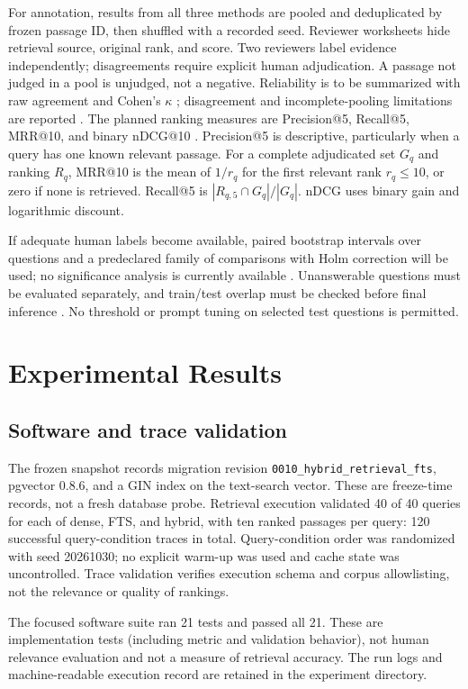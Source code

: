 \documentclass[conference]{IEEEtran}
\begin{document}
For annotation, results from all three methods are pooled and deduplicated by frozen passage ID, then shuffled with a recorded seed. Reviewer worksheets hide retrieval source, original rank, and score. Two reviewers label evidence independently; disagreements require explicit human adjudication. A passage not judged in a pool is unjudged, not a negative. Reliability is to be summarized with raw agreement and Cohen's $\kappa$ \cite{r11,r69,r70}; disagreement and incomplete-pooling limitations are reported \cite{r65,r66}. The planned ranking measures are Precision@5, Recall@5, MRR@10, and binary nDCG@10 \cite{r63,r64}. Precision@5 is descriptive, particularly when a query has one known relevant passage. For a complete adjudicated set $G_q$ and ranking $R_q$, MRR@10 is the mean of $1/r_q$ for the first relevant rank $r_q\leq10$, or zero if none is retrieved. Recall@5 is $|R_{q,5}\cap G_q|/|G_q|$. nDCG uses binary gain and logarithmic discount.

If adequate human labels become available, paired bootstrap intervals over questions and a predeclared family of comparisons with Holm correction will be used; no significance analysis is currently available \cite{r12,r67,r68}. Unanswerable questions must be evaluated separately, and train/test overlap must be checked before final inference \cite{r60,r61,r62}. No threshold or prompt tuning on selected test questions is permitted.

\section{Experimental Results}
\subsection{Software and trace validation}
The frozen snapshot records migration revision \texttt{0010\_hybrid\_retrieval\_fts}, pgvector 0.8.6, and a GIN index on the text-search vector. These are freeze-time records, not a fresh database probe. Retrieval execution validated 40 of 40 queries for each of dense, FTS, and hybrid, with ten ranked passages per query: 120 successful query-condition traces in total. Query-condition order was randomized with seed 20261030; no explicit warm-up was used and cache state was uncontrolled. Trace validation verifies execution schema and corpus allowlisting, not the relevance or quality of rankings.

The focused software suite ran 21 tests and passed all 21. These are implementation tests (including metric and validation behavior), not human relevance evaluation and not a measure of retrieval accuracy. The run logs and machine-readable execution record are retained in the experiment directory.
\end{document}
